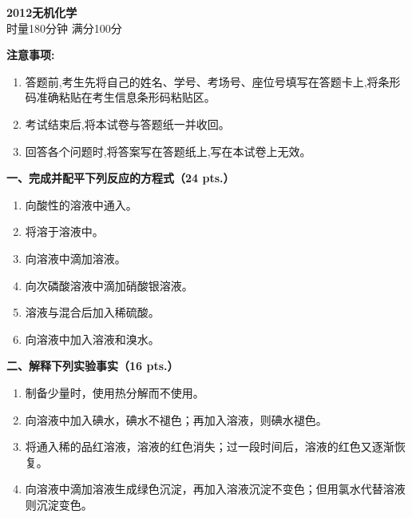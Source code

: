 \begin{center}
    {\LARGE \textbf{2012无机化学}} \\[2ex]
    {\large 时量180分钟 \quad 满分100分}
\end{center}

\vspace{0.5cm}
\noindent\textbf{注意事项:}
\begin{enumerate}[label=\arabic*., parsep=0pt, itemsep=0pt]
    \item 答题前,考生先将自己的姓名、学号、考场号、座位号填写在答题卡上,将条形码准确粘贴在考生信息条形码粘贴区。
    \item 考试结束后,将本试卷与答题纸一并收回。
    \item 回答各个问题时,将答案写在答题纸上,写在本试卷上无效。
\end{enumerate}

\vspace{0.5cm}
\noindent\textbf{一、完成并配平下列反应的方程式（24 pts.）}

\begin{enumerate}[label=\arabic*., start=1, itemsep=1.5ex]
    \item 向酸性的溶液中通入。
    \item 将溶于溶液中。
    \item 向溶液中滴加溶液。
    \item 向次磷酸溶液中滴加硝酸银溶液。
    \item {}溶液与混合后加入稀硫酸。
    \item 向溶液中加入溶液和溴水。
\end{enumerate}

\vspace{0.5cm}
\noindent\textbf{二、解释下列实验事实（16 pts.）}

\begin{enumerate}[label=\arabic*., start=1, itemsep=1.5ex]
    \item 制备少量时，使用热分解而不使用。
    \item 向溶液中加入碘水，碘水不褪色；再加入溶液，则碘水褪色。
    \item 将通入稀的品红溶液，溶液的红色消失；过一段时间后，溶液的红色又逐渐恢复。
    \item 向溶液中滴加溶液生成绿色沉淀，再加入溶液沉淀不变色；但用氯水代替溶液则沉淀变色。
\end{enumerate}

